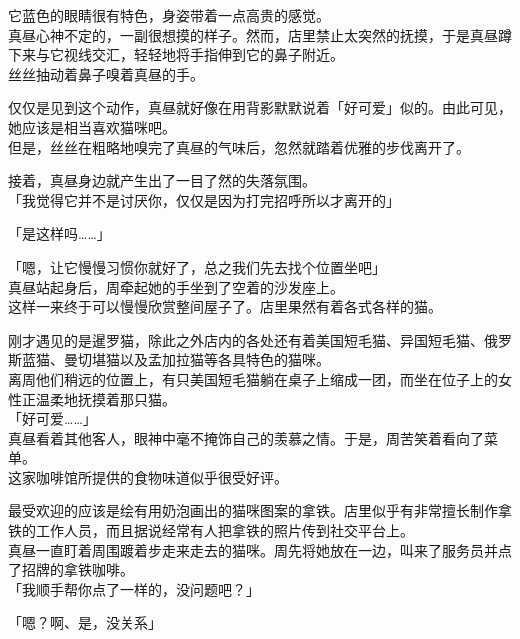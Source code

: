 它蓝色的眼睛很有特色，身姿带着一点高贵的感觉。\\

真昼心神不定的，一副很想摸的样子。然而，店里禁止太突然的抚摸，于是真昼蹲下来与它视线交汇，轻轻地将手指伸到它的鼻子附近。\\

丝丝抽动着鼻子嗅着真昼的手。

仅仅是见到这个动作，真昼就好像在用背影默默说着「好可爱」似的。由此可见，她应该是相当喜欢猫咪吧。\\

但是，丝丝在粗略地嗅完了真昼的气味后，忽然就踏着优雅的步伐离开了。

接着，真昼身边就产生出了一目了然的失落氛围。\\

「我觉得它并不是讨厌你，仅仅是因为打完招呼所以才离开的」

「是这样吗……」

「嗯，让它慢慢习惯你就好了，总之我们先去找个位置坐吧」\\

真昼站起身后，周牵起她的手坐到了空着的沙发座上。\\

这样一来终于可以慢慢欣赏整间屋子了。店里果然有着各式各样的猫。

刚才遇见的是暹罗猫，除此之外店内的各处还有着美国短毛猫、异国短毛猫、俄罗斯蓝猫、曼切堪猫以及孟加拉猫等各具特色的猫咪。\\

离周他们稍远的位置上，有只美国短毛猫躺在桌子上缩成一团，而坐在位子上的女性正温柔地抚摸着那只猫。\\

「好可爱……」\\

真昼看着其他客人，眼神中毫不掩饰自己的羡慕之情。于是，周苦笑着看向了菜单。\\

这家咖啡馆所提供的食物味道似乎很受好评。

最受欢迎的应该是绘有用奶泡画出的猫咪图案的拿铁。店里似乎有非常擅长制作拿铁的工作人员，而且据说经常有人把拿铁的照片传到社交平台上。\\

真昼一直盯着周围踱着步走来走去的猫咪。周先将她放在一边，叫来了服务员并点了招牌的拿铁咖啡。\\

「我顺手帮你点了一样的，没问题吧？」

「嗯？啊、是，没关系」\\

